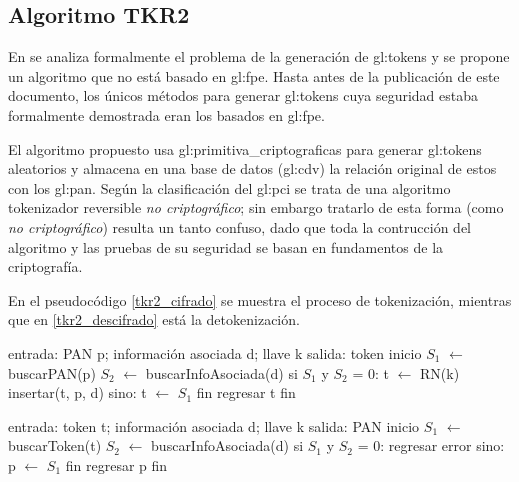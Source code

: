 %
%

\subsection{Algoritmo TKR2}
\label{sec:tkr}

En \cite{doc_sandra} se analiza formalmente el problema de la generación de
\glspl{gl:token} y se propone un algoritmo que no está basado en \gls{gl:fpe}.
Hasta antes de la publicación de este documento, los únicos métodos para
generar \glspl{gl:token} cuya seguridad estaba formalmente demostrada eran los
basados en \gls{gl:fpe}.

El algoritmo propuesto usa \glspl{gl:primitiva_criptografica} para generar
\glspl{gl:token} aleatorios y almacena en una base de datos (\gls{gl:cdv}) la
relación original de estos con los \gls{gl:pan}. Según la clasificación del
\gls{gl:pci} se trata de una algoritmo tokenizador reversible \textit{no
criptográfico}; sin embargo tratarlo de esta forma (como \textit{no
criptográfico}) resulta un tanto confuso, dado que toda la contrucción del
algoritmo y las pruebas de su seguridad se basan en fundamentos de la
criptografía.

En el pseudocódigo \ref{tkr2_cifrado} se muestra el proceso de tokenización,
mientras que en \ref{tkr2_descifrado} está la detokenización.

\begin{pseudocodigo}[%
    caption={\textit{TKR2}, método de tokenización},
    label={tkr2_cifrado}%
  ]
    entrada: PAN p; información asociada d; llave k
    salida:  token
    inicio
      $ S_1 $ $ \gets $ buscarPAN(p)
      $ S_2 $ $ \gets $ buscarInfoAsociada(d)
      si $ S_1 $ y $ S_2 $ = 0:
        t $ \gets $ RN(k)
        insertar(t, p, d)
      sino:
        t $ \gets $ $ S_1 $
      fin
      regresar t
    fin
\end{pseudocodigo}

\begin{pseudocodigo}[%
    caption={\textit{TKR2}, método de detokenización},
    label={tkr2_descifrado}%
  ]
    entrada: token t; información asociada d; llave k
    salida:  PAN
    inicio
      $ S_1 $ $ \gets $ buscarToken(t)
      $ S_2 $ $ \gets $ buscarInfoAsociada(d)
      si $ S_1 $ y $ S_2 $ = 0:
        regresar error
      sino:
        p $ \gets $ $ S_1 $
      fin
      regresar p
    fin
\end{pseudocodigo}

